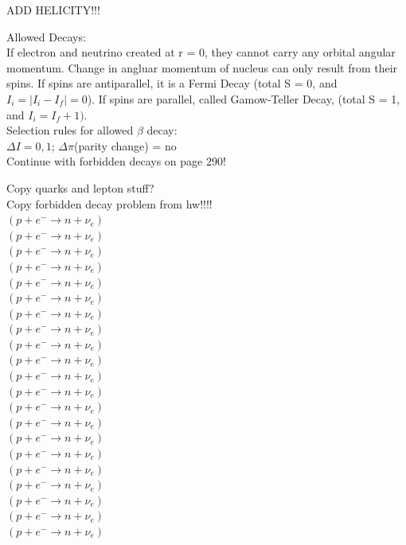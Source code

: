 \documentclass{article}
\begin{document}
\begin{multicols}{3}
ADD HELICITY!!!

Allowed Decays:\\
If electron and neutrino created at r = 0, they cannot carry any orbital angular momentum.  Change in angluar momentum of nucleus can only result from their spins.  If spins are antiparallel, it is a Fermi Decay (total S = 0, and $I_{i} = |I_{i} - I_{f}| = 0$).  If spins are parallel, called Gamow-Teller Decay, (total S = 1, and $I_{i} = I_{f} + 1)$.\\
Selection rules for allowed $\beta$ decay:\\
$\Delta I = 0,1$; $\Delta \pi$(parity change) = no\\

Continue with forbidden decays on page 290!

Copy quarks and lepton stuff?\\
Copy forbidden decay problem from hw!!!!\\
$(p + e^{-}\rightarrow n + \nu_{e})$\\
$(p + e^{-}\rightarrow n + \nu_{e})$\\
$(p + e^{-}\rightarrow n + \nu_{e})$\\
$(p + e^{-}\rightarrow n + \nu_{e})$\\
$(p + e^{-}\rightarrow n + \nu_{e})$\\
$(p + e^{-}\rightarrow n + \nu_{e})$\\
$(p + e^{-}\rightarrow n + \nu_{e})$\\
$(p + e^{-}\rightarrow n + \nu_{e})$\\
$(p + e^{-}\rightarrow n + \nu_{e})$\\
$(p + e^{-}\rightarrow n + \nu_{e})$\\
$(p + e^{-}\rightarrow n + \nu_{e})$\\
$(p + e^{-}\rightarrow n + \nu_{e})$\\
$(p + e^{-}\rightarrow n + \nu_{e})$\\
$(p + e^{-}\rightarrow n + \nu_{e})$\\
$(p + e^{-}\rightarrow n + \nu_{e})$\\
$(p + e^{-}\rightarrow n + \nu_{e})$\\
$(p + e^{-}\rightarrow n + \nu_{e})$\\
$(p + e^{-}\rightarrow n + \nu_{e})$\\
$(p + e^{-}\rightarrow n + \nu_{e})$\\
$(p + e^{-}\rightarrow n + \nu_{e})$\\
$(p + e^{-}\rightarrow n + \nu_{e})$\\

\end{multicols}
\end{document}
